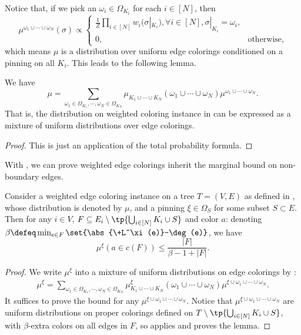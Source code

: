 Notice that, if we pick an $\omega_i\in\Omega_{K_i}$ for each $i\in [N]$,
then
\[\mu^{\omega_1\cup\cdots\cup \omega_N}(\sigma)
\propto
\begin{cases}
 \frac{1}{Z}   \prod_{i\in [N]} w_i(\sigma|_{K_i}),  \forall i\in [N], \sigma|_{K_i} = \omega_i,
 \\ 0, & \text{otherwise},
\end{cases}
\]
which means $\mu$ is a distribution over uniform edge colorings conditioned on a 
pinning on all $K_i$. This leads to the following lemma.
\begin{lemma}\label{lem:weighted-decomposition-to-unweighted}
    We have
    \[
        \mu = \sum_{\omega_1\in \Omega_{K_1},\cdots, \omega_N\in \Omega_{K_N}}
        \mu_{K_1\cup\cdots\cup K_N}(\omega_1\cup\cdots\cup\omega_{N}) \mu^{\omega_1\cup\cdots\cup\omega_N}.
    \]
    That is, the distribution on weighted coloring instance in 
    can be expressed as a mixture of uniform distributions over edge colorings.
\end{lemma}
\begin{proof}
    This is just an application of the total probability formula.
\end{proof}

With , we can prove
weighted edge colorings inherit the marginal bound 
on non-boundary edges.
\begin{lemma}\label{lem:marginal-upper-weighted}
    Consider a weighted edge coloring instance on a tree $T=(V, E)$
    as defined in ,
    whose distribution is denoted by $\mu$, and a pinning $\xi\in \Omega_{S}$ for some subset $S\subset E$.
    Then for any $i\in V$, $F\subseteq E_i\setminus \tp{\bigcup_{i\in [N]}K_i\cup S}$ and color $a$:
    denoting $\beta\defeq\min_{e\in F}\set{\abs{\+L^\xi(e)}-\deg(e)}$, we have
    \[\mu^\xi(a\in c(F)) \le \frac{|F|}{\beta - 1 + |F|}.\]
\end{lemma}
\begin{proof}
    We write $\mu^\xi$ into a mixture of uniform distributions on edge colorings
    by :
    \begin{align*}
        \mu^\xi = \sum_{\omega_1\in \Omega_{K_1},\cdots, \omega_N\in \Omega_{K_N}}
        \mu^\xi_{K_1\cup\cdots\cup K_N}(\omega_1\cup\cdots\cup\omega_{N}) \mu^{\xi\cup\omega_1\cup\cdots\cup\omega_N}.
    \end{align*}
    It suffices to prove the bound for any $\mu^{\xi\cup\omega_1\cup\cdots\cup\omega_N}$.
    Notice that $\mu^{\xi\cup\omega_1\cup\cdots\cup\omega_N}$ are uniform distributions 
    on proper colorings defined on $T\setminus\tp{\bigcup_{i\in [N]}K_i\cup S}$, with $\beta$-extra colors 
    on all edges in $F$,
    so  applies and proves the lemma.
\end{proof}

